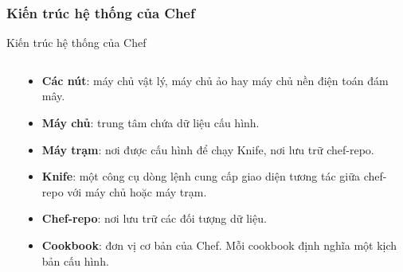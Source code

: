 \documentclass[14pt]{beamer}
\begin{document}
\subsubsection*{Kiến trúc hệ thống của Chef}
\begin{frame}{Kiến trúc hệ thống của Chef}
  \setlength{\topsep}{0pt}
  \begin{columns}
    \begin{column}{0.75\textwidth}
      \begin{center}
      \end{center}
    \end{column}
    \hfill
    \pause
    \begin{column}{0.38\textwidth}
      \begin{scriptsize}
        \begin{itemize}
          \item \textbf{Các nút}: máy chủ vật lý, máy chủ ảo hay máy chủ nền điện toán đám mây.
          \pause
          \item \textbf{Máy chủ}: trung tâm chứa dữ liệu cấu hình.
          \pause
          \item \textbf{Máy trạm}: nơi được cấu hình để chạy Knife, nơi lưu trữ chef-repo.
          \pause
          \item \textbf{Knife}: một công cụ dòng lệnh cung cấp giao diện tương tác giữa chef-repo với máy chủ hoặc máy trạm.
          \pause
          \item \textbf{Chef-repo}: nơi lưu trữ các đối tượng dữ liệu.
          \pause
          \item \textbf{Cookbook}: đơn vị cơ bản của Chef. Mỗi cookbook định nghĩa một kịch bản cấu hình.
        \end{itemize}
      \end{scriptsize}
    \end{column}
  \end{columns}
\end{frame}
\end{document}
